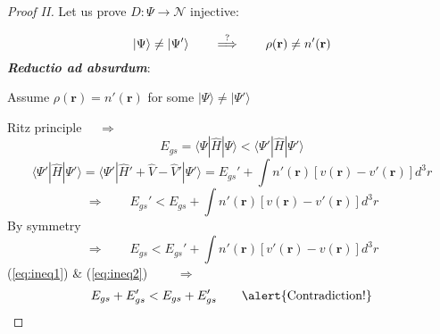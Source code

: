 \documentclass[compress]{beamer}
\newcommand*{\ket}[1]{|#1\rangle}
\newcommand*{\bra}[1]{\langle#1|}
\begin{document}
\frame
 {
   \frametitle{}
 \begin{small}
 {\scriptsize
\begin{proof}[Proof II]
  Let us prove $D:\Psi \longrightarrow \mathcal{N}$ injective:

\begin{equation}
  \ket{\Psi}\neq \ket{\Psi'} \qquad \stackrel{{\LARGE ?}}{\Longrightarrow } \qquad \rho(\mathbf{r})\neq n'(\mathbf{r}) \nonumber
\end{equation}
\textbf{\emph{Reductio ad absurdum}}: 
\vspace{1mm}

Assume $\rho(\mathbf{r})=n'(\mathbf{r})$ for some $\ket{\Psi}\neq \ket{\Psi'}$ 

Ritz principle $\quad \Longrightarrow $
\begin{equation}
  E_{gs}=\bra{\Psi}\hat{H}\ket{\Psi}<\bra{\Psi'}\hat{H}\ket{\Psi'} \nonumber   
\end{equation}
\begin{equation}
  \bra{\Psi'}\hat{H}\ket{\Psi'}=\bra{\Psi'}\hat{H}'+\hat{V}-\hat{V}'\ket{\Psi'}=E_{gs}'+\int n'(\mathbf{r})[v(\mathbf{r})-v'(\mathbf{r})]d^{3}r \nonumber
\end{equation}
\begin{equation}\label{eq:ineq1}
  \Longrightarrow \qquad E_{gs}'<E_{gs}+\int n'(\mathbf{r})[v(\mathbf{r})-v'(\mathbf{r})]d^{3}r %
\end{equation}
By symmetry
\begin{equation}\label{eq:ineq2}
  \Longrightarrow \qquad E_{gs}<E_{gs}'+\int n'(\mathbf{r})[v'(\mathbf{r})-v(\mathbf{r})]d^{3}r %
\end{equation}
(\ref{eq:ineq1}) \& (\ref{eq:ineq2}) $\qquad \Longrightarrow $
\begin{equation}
  E_{gs}+E_{gs}'<E_{gs}+E_{gs}' \qquad \text{\alert{Contradiction!}} \nonumber
\end{equation}
\end{proof}
 }
 \end{small}
 }
\end{document}
